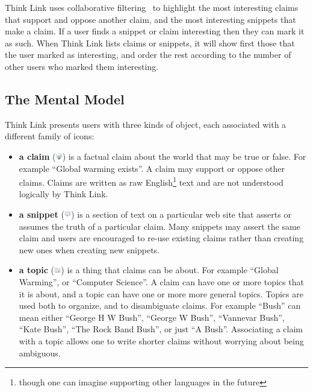 \documentclass{chi2009}
\begin{document}
Think Link uses collaborative filtering~\cite{collaborativefilter} to highlight the most interesting claims that support and oppose another claim, and the most interesting snippets that make a claim. If a user finds a snippet or claim interesting then they can mark it as such. When Think Link lists claims or snippets, it will show first those that the user marked as interesting, and order the rest according to the number of other users who marked them interesting.

\subsection{The Mental Model}

Think Link presents users with three kinds of object, each associated with a different family of icons:

\begin{itemize}
\item {\bf a claim} (\includegraphics[width=0.3cm]{../images/lightbulb_off.png}) is a factual claim about the world that may be true or false. For example ``Global warming exists''. A claim may support or oppose other claims. Claims are written as raw English\footnote{though one can imagine supporting other languages in the future} text and are not understood logically by Think Link.
\item {\bf a snippet} (\includegraphics[width=0.3cm]{../images/comment.png}) is a section of text on a particular web site that asserts or assumes the truth of a particular claim. Many snippets may assert the same claim and users are encouraged to re-use existing claims rather than creating new ones when creating new snippets.
\item {\bf a topic} (\includegraphics[width=0.3cm]{../images/folder_grey.png}) is a thing that claims can be about. For example ``Global Warming'', or ``Computer Science''. A claim can have one or more topics that it is about, and a topic can have one or more more general topics. Topics are used both to organize, and to disambiguate claims. For example ``Bush'' can mean either ``George H W Bush'', ``George W Bush'', ``Vannevar Bush'', ``Kate Bush'', ``The Rock Band Bush'', or just ``A Bush''. Associating a claim with a topic allows one to write shorter claims without worrying about being ambiguous.
\end{itemize}
\end{document}
